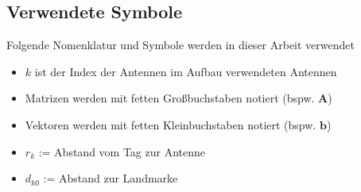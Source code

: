 \newpage
\subsection*{Verwendete Symbole}
Folgende Nomenklatur und Symbole werden in dieser Arbeit verwendet
\begin{itemize}
	\item	$k$ ist der Index der Antennen im Aufbau verwendeten Antennen
	\item	Matrizen werden mit fetten Großbuchstaben notiert (bspw. $\mathbf{A}$)
	\item	Vektoren werden mit fetten Kleinbuchstaben notiert (bspw. $\mathbf{b}$)
	\item	$r_{k}$ := Abstand vom Tag zur Antenne
	\item	$d_{k0}$ := Abstand zur Landmarke
	
\end{itemize}
